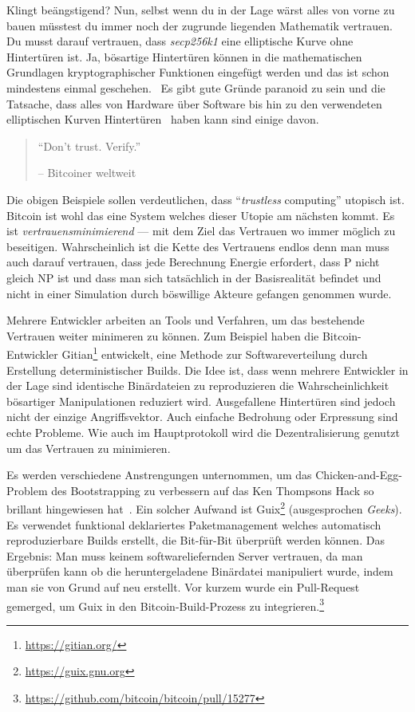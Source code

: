 Klingt beängstigend? Nun, selbst wenn du in der Lage wärst alles von vorne zu
bauen müsstest du immer noch der zugrunde liegenden Mathematik vertrauen. Du
musst darauf vertrauen, dass \textit{secp256k1} eine elliptische Kurve ohne
Hintertüren ist. Ja, bösartige Hintertüren können in die mathematischen
Grundlagen kryptographischer Funktionen eingefügt werden und das ist schon
mindestens einmal geschehen.~\cite{wiki:Dual_EC_DRBG} Es gibt gute Gründe
paranoid zu sein und die Tatsache, dass alles von Hardware über Software bis hin
zu den verwendeten elliptischen Kurven Hintertüren~\cite{wiki:backdoors} haben
kann sind einige davon.

\begin{quotation}\begin{samepage}
\enquote{Don't trust. Verify.}
\begin{flushright} -- Bitcoiner weltweit
\end{flushright}\end{samepage}\end{quotation}

Die obigen Beispiele sollen verdeutlichen, dass \enquote{\textit{trustless}
computing} utopisch ist. Bitcoin ist wohl das eine System welches dieser Utopie
am nächsten kommt. Es ist \textit{vertrauensminimierend} — mit dem Ziel das
Vertrauen wo immer möglich zu beseitigen. Wahrscheinlich ist die Kette des
Vertrauens endlos denn man muss auch darauf vertrauen, dass jede Berechnung
Energie erfordert, dass P nicht gleich NP ist und dass man sich tatsächlich in
der Basisrealität befindet und nicht in einer Simulation durch böswillige
Akteure gefangen genommen wurde.

Mehrere Entwickler arbeiten an Tools und Verfahren, um das bestehende Vertrauen
weiter minimeren zu können. Zum Beispiel haben die Bitcoin-Entwickler
Gitian\footnote{\url{https://gitian.org/}} entwickelt, eine Methode zur
Softwareverteilung durch Erstellung deterministischer Builds. Die Idee ist, dass
wenn mehrere Entwickler in der Lage sind identische Binärdateien zu
reproduzieren die Wahrscheinlichkeit bösartiger Manipulationen reduziert wird.
Ausgefallene Hintertüren sind jedoch nicht der einzige Angriffsvektor. Auch
einfache Bedrohung oder Erpressung sind echte Probleme. Wie auch im
Hauptprotokoll wird die Dezentralisierung genutzt um das Vertrauen zu
minimieren.

Es werden verschiedene Anstrengungen unternommen, um das Chicken-and-Egg-Problem
des Bootstrapping zu verbessern auf das Ken Thompsons Hack so brillant
hingewiesen hat~\cite{web:bootstrapping}. Ein solcher Aufwand ist
Guix\footnote{\url{https://guix.gnu.org}} (ausgesprochen \textit{Geeks}). Es
verwendet funktional deklariertes Paketmanagement welches automatisch
reproduzierbare Builds erstellt, die Bit-für-Bit überprüft werden können. Das
Ergebnis: Man muss keinem softwareliefernden Server vertrauen, da man überprüfen
kann ob die heruntergeladene Binärdatei manipuliert wurde, indem man sie von
Grund auf neu erstellt. Vor kurzem wurde ein Pull-Request gemerged, um Guix in
den Bitcoin-Build-Prozess zu
integrieren.\footnote{\url{https://github.com/bitcoin/bitcoin/pull/15277}}

